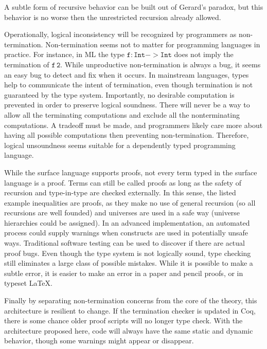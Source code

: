 A subtle form of recursive behavior can be built out of Gerard's paradox\cite{Reinhold89typecheckingis},
but this behavior is no worse then the unrestricted recursion already
allowed.


Operationally, logical inconsistency will be recognized by programmers
as non-termination. Non-termination seems not to matter for programming
languages in practice. For instance, in ML the type $\mathtt{f:Int->Int}$
does not imply the termination of $\mathtt{f\,2}$. While unproductive
non-termination is always a bug, it seems an easy bug to detect and
fix when it occurs. In mainstream languages, types help to communicate
the intent of termination, even though termination is not guaranteed
by the type system. Importantly, no desirable computation is prevented
in order to preserve logical soundness. There will never be a way
to allow all the terminating computations and exclude all the nonterminating
computations. A tradeoff must be made, and programmers likely care
more about having all possible computations then preventing non-termination.
Therefore, logical unsoundness seems suitable for a dependently typed
programming language.



While the surface language supports proofs, not every term typed in
the surface language is a proof. Terms can still be called proofs
as long as the safety of recursion and type-in-type are checked externally.
In this sense, the listed example inequalities are proofs, as they
make no use of general recursion (so all recursions are well founded)
and universes are used in a safe way (universe hierarchies could be
assigned). In an advanced implementation, an automated process could
supply warnings when constructs are used in potentially unsafe ways.
Traditional software testing can be used to discover if there are
actual proof bugs. Even though the type system is not logically sound,
type checking still eliminates a large class of possible mistakes.
While it is possible to make a subtle error, it is easier to make
an error in a paper and pencil proofs, or in typeset \LaTeX .

Finally by separating non-termination concerns from the core of the
theory, this architecture is resilient to change. If the termination
checker is updated in Coq, there is some chance older proof scripts
will no longer type check. With the architecture proposed here, code
will always have the same static and dynamic behavior, though some
warnings might appear or disappear.

